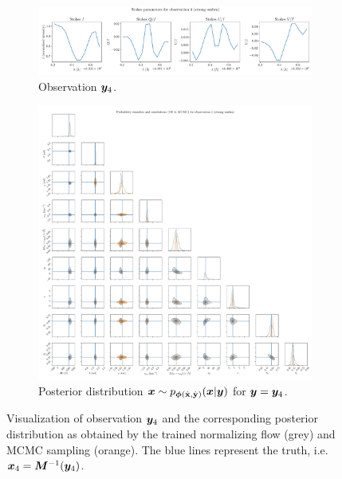 \documentclass[a4paper,11pt]{report}
\begin{document}
\begin{figure}[h!]
	\centering
	\begin{subfigure}[t]{\textwidth}
	\centering
	\includegraphics[width=\textwidth]{figures/nf-milne-eddington-example-6-corner-spectrum-4-nf-nflows-piecewisequadratic.pdf}
    \caption{Observation $\bm{y}_4$.}
	\end{subfigure}
	\begin{subfigure}[t]{\textwidth}
	\centering
	\includegraphics[width=\textwidth]{figures/nf-milne-eddington-example-6-corner-4-nf-mcmc-nflows-piecewisequadratic.pdf}
    \caption{Posterior distribution $\bm{x}\sim p_{\bm{\phi}(\hat{\boldsymbol{\mathbf{x}}},\hat{\boldsymbol{\mathbf{y}}})}(\bm{x}|\bm{y})$ for $\bm{y} = \bm{y}_4$.}
	\end{subfigure}
\cprotect\caption{Visualization of observation $\bm{y}_4$ and the corresponding posterior distribution as obtained by the trained normalizing flow (grey) and MCMC sampling (orange). The blue lines represent the truth, i.e. $\bm{x}_4 = \bm{M}^{-1}(\bm{y}_4)$.}
\label{fig:nf-milne-eddington-example-6-corner-4-nf-piecewisequadratic-results}
\end{figure}
\end{document}
